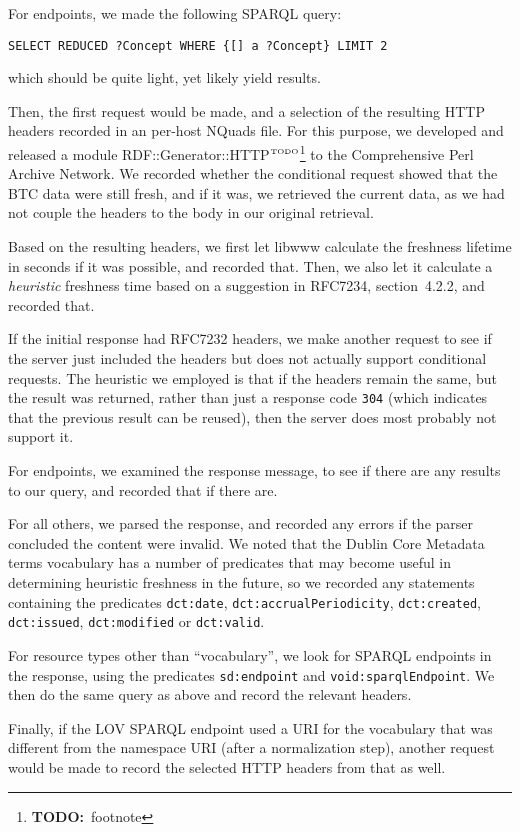 \documentclass{article}
\newcommand{\rdfterm}[1]{\texttt{#1}}
\newcommand{\httph}[1]{\texttt{#1}}
\newcommand{\todo}[1]{\ensuremath{^{\textrm{\tiny{TODO}\normalsize}}}\footnote{\textbf{TODO:}~#1}}
\begin{document}
For endpoints, we made the following SPARQL query:
\begin{verbatim}
SELECT REDUCED ?Concept WHERE {[] a ?Concept} LIMIT 2
\end{verbatim}
which should be quite light, yet likely yield results.

Then, the first request would be made, and a selection of the
resulting HTTP headers recorded in an per-host NQuads file. For this
purpose, we developed and released a module
RDF::Generator::HTTP\todo{footnote} to the Comprehensive Perl Archive
Network. We recorded whether the conditional request showed that the
BTC data were still fresh, and if it was, we retrieved the current
data, as we had not couple the headers to the body in our original
retrieval.

Based on the resulting headers, we first let libwww calculate the
freshness lifetime in seconds if it was possible, and recorded
that. Then, we also let it calculate a \emph{heuristic} freshness
time based on a suggestion in RFC7234, section~4.2.2, and recorded that.

If the initial response had RFC7232 headers, we make another
request to see if the server just included the headers but does not
actually support conditional requests. The heuristic we employed is
that if the headers remain the same, but the result was returned,
rather than just a response code \httph{304} (which indicates that the
previous result can be reused), then the server does most probably not
support it.

For endpoints, we examined the response message, to see if there are
any results to our query, and recorded that if there are.

For all others, we parsed the response, and recorded any errors if the
parser concluded the content were invalid. We noted that the Dublin Core
Metadata terms vocabulary has a number of predicates that may become
useful in determining heuristic freshness in the future, so we
recorded any statements containing the predicates \rdfterm{dct:date},
\rdfterm{dct:accrualPeriodicity}, \rdfterm{dct:created},
\rdfterm{dct:issued}, \rdfterm{dct:modified} or \rdfterm{dct:valid}.

For resource types other than ``vocabulary'', we look for SPARQL
endpoints in the response, using the predicates \rdfterm{sd:endpoint}
and \rdfterm{void:sparqlEndpoint}. We then do the same query as above
and record the relevant headers.

Finally, if the LOV SPARQL endpoint used a URI for the vocabulary that
was different from the namespace URI (after a normalization step),
another request would be made to record the selected HTTP headers from
that as well.
\end{document}
